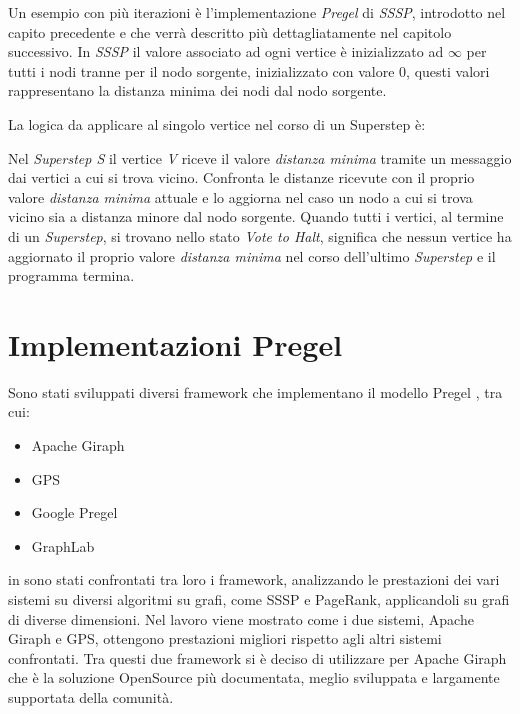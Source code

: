 \documentclass[LaM,binding=0.6cm]{sapthesis}
\begin{document}
Un esempio con più iterazioni è l'implementazione \textit{Pregel} di \textit{SSSP}, introdotto nel capito precedente e che verrà descritto più dettagliatamente nel capitolo successivo. In \textit{SSSP }il valore associato ad ogni vertice è inizializzato ad $\infty$ per tutti i nodi tranne per il nodo sorgente, inizializzato con valore 0, questi valori rappresentano la distanza minima dei nodi dal nodo sorgente.

La logica da applicare al singolo vertice nel corso di un Superstep è:




Nel \textit{Superstep S} il vertice \textit{V }riceve il valore \textit{distanza minima} tramite un messaggio dai vertici a cui si trova vicino. Confronta le distanze ricevute con il proprio valore \textit{distanza minima} attuale e lo aggiorna nel caso un nodo a cui si trova vicino sia a distanza minore dal nodo sorgente.
Quando tutti i vertici, al termine di un \textit{Superstep}, si trovano nello stato \textit{Vote to Halt}, significa che nessun vertice ha aggiornato il proprio valore \textit{distanza minima} nel corso dell'ultimo \textit{Superstep} e il programma termina. 



\section{Implementazioni Pregel}
Sono stati sviluppati diversi framework che implementano il modello Pregel \cite{Karloff:2010:MCM:1873601.1873677}, tra cui:
\begin{itemize}
\item Apache Giraph \cite{4_giraph.apache.org_2015}
\item GPS\cite{5_infolab.stanford.edu_2015}
\item Google Pregel \cite{Malewicz:2010:PSL:1807167.1807184}
\item GraphLab \cite{6_dato_2015}
\end{itemize}

in \cite{Han:2014:ECP:2732977.2732980} sono stati confrontati tra loro i framework, analizzando le prestazioni dei vari sistemi su diversi algoritmi su grafi, come SSSP e PageRank, applicandoli su grafi di diverse dimensioni.
Nel lavoro viene mostrato come i due sistemi, Apache Giraph e GPS, ottengono prestazioni migliori rispetto agli altri sistemi confrontati. Tra questi due framework si è deciso di utilizzare per Apache Giraph che è la soluzione OpenSource più documentata, meglio sviluppata e largamente supportata della comunità.
\end{document}
